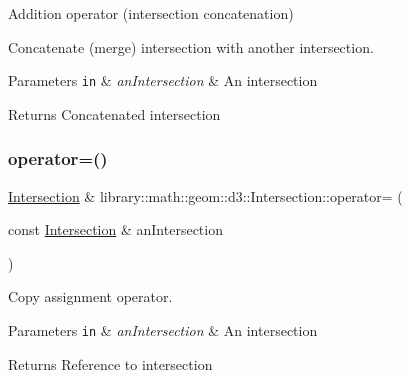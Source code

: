 Addition operator (intersection concatenation) 

Concatenate (merge) intersection with another intersection.


\begin{DoxyParams}[1]{Parameters}
\mbox{\tt in}  & {\em an\+Intersection} & An intersection \\
\hline
\end{DoxyParams}
\begin{DoxyReturn}{Returns}
Concatenated intersection 
\end{DoxyReturn}
\mbox{\label{classlibrary_1_1math_1_1geom_1_1d3_1_1_intersection_a41ca5e5ac6fe7bc3f26f516acde56be8}} 
\subsubsection{\texorpdfstring{operator=()}{operator=()}}
{\footnotesize\ttfamily \hyperlink{classlibrary_1_1math_1_1geom_1_1d3_1_1_intersection}{Intersection} \& library\+::math\+::geom\+::d3\+::\+Intersection\+::operator= (\begin{DoxyParamCaption}\item[{const \hyperlink{classlibrary_1_1math_1_1geom_1_1d3_1_1_intersection}{Intersection} \&}]{an\+Intersection }\end{DoxyParamCaption})}



Copy assignment operator. 


\begin{DoxyParams}[1]{Parameters}
\mbox{\tt in}  & {\em an\+Intersection} & An intersection \\
\hline
\end{DoxyParams}
\begin{DoxyReturn}{Returns}
Reference to intersection 
\end{DoxyReturn}
\mbox{\label{classlibrary_1_1math_1_1geom_1_1d3_1_1_intersection_a4205e2dcace3faa8abfeb829423d0baf}} 
